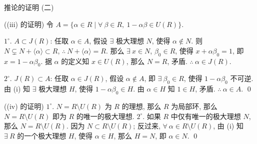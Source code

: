 \begin{frame}{推论的证明 (二)}

\startproof[bg=yellow, fg=red]((iii) 的证明)
令 $A = \{ \alpha \in R \mid \forall\ \beta \in R,\ 1 - \alpha \beta \in U(R) \}$.

$1^{\circ}$. $A \subset J(R)$: 任取 $\alpha \in A$, 假设 $\exists$
极大理想 $N$, 使得 $\alpha \notin N$.
则 $N \subsetneq N + \langle \alpha \rangle \subset R$,
$\therefore\ N + \langle \alpha \rangle = R$.
那么 $\exists\ x \in N$, $\beta_0 \in R$,
使得 $x + \alpha \beta_0 = 1$, 即 $x = 1 - \alpha \beta_0$.
据 $\alpha$ 的定义知 $x \in U(R)$, 那么 $N = R$, 矛盾.
$\therefore\ \alpha \in J(R)$.

\pause

$2^{\circ}$. $J(R) \subset A$: 任取 $\alpha \in J(R)$, 假设 $\alpha \notin A$,
即 $\exists\ \beta_0 \in R$, 使得 $1 - \alpha \beta_0$ 不可逆.
由 (i) 知 $\exists$ 极大理想 $H$, 使得 $1 - \alpha \beta_0 \in H$.
由 $\alpha \in H$ 知 $1 \in H$, 矛盾. $\therefore\ \alpha \in A$.
\qed

\pause

\startproof[bg=yellow, fg=red]((iv) 的证明)
$1^{\circ}$. $N = R \setminus U(R)$ 为 $R$ 的理想, 那么 $R$ 为局部环,
那么 $N = R \setminus U(R)$ 即为 $R$ 的唯一的极大理想.
$2^{\circ}$. 如果 $R$ 中仅有唯一的极大理想 $N$, 那么 $N = R \setminus U(R)$.
因为 $N \subset R \setminus U(R)$; 反过来, $\forall\ \alpha \in R \setminus U(R)$,
由 (i) 知 $\exists\ R$ 的一个极大理想 $H$, 使得 $\alpha \in H$,
那么 $H = N$, 即 $\alpha \in N$.
\qed

\end{frame}



